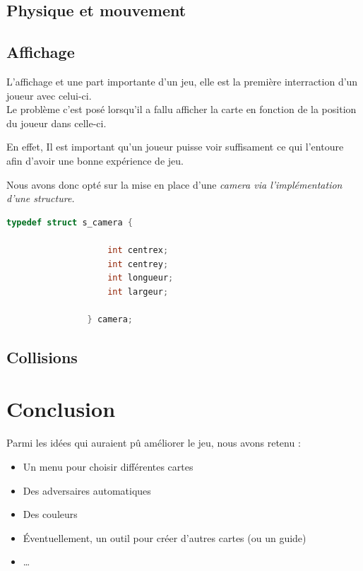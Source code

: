 \documentclass[12pt]{article}
\begin{document}
	
		\subsection{Physique et mouvement}
		
		\subsection{Affichage}
		
			L'affichage et une part importante d'un jeu, elle est la première interraction d'un joueur avec celui-ci.\\


			Le problème c'est posé lorsqu'il a fallu afficher la carte en fonction de la position du joueur dans celle-ci.

			En effet, Il est important qu'un joueur puisse voir suffisament ce qui l'entoure afin d'avoir une bonne expérience de jeu.

			Nous avons donc opté sur la mise en place d'une \itshape{camera} via l'implémentation d'une structure.
			\begin{lstlisting}[language=C, title={Structure Camera}]
				typedef struct s_camera {
				
					int centrex;
					int centrey;
					int longueur;
					int largeur;
				
				} camera;
			\end{lstlisting}

		\subsection{Collisions}
		
		
		

	\section{Conclusion}

	Parmi les idées qui auraient pû améliorer le jeu, nous avons retenu :
	\begin{itemize}
		\item Un menu pour choisir différentes cartes
		\item Des adversaires automatiques
		\item Des couleurs
		\item Éventuellement, un outil pour créer d'autres cartes (ou un guide)
		\item \dots
	\end{itemize}
		
\end{document}
